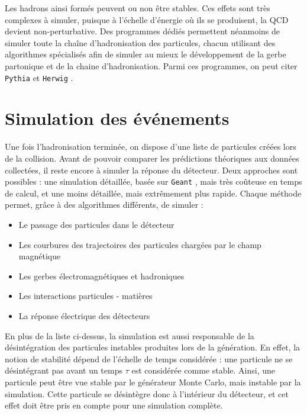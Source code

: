 Les hadrons ainsi formés peuvent ou non être stables. Ces effets sont très complexes à simuler, puisque à l'échelle d'énergie où ils se produisent, la QCD devient non-perturbative. Des programmes dédiés permettent néanmoins de simuler toute la chaîne d'hadronisation des particules, chacun utilisant des algorithmes spécialisés afin de simuler au mieux le développement de la gerbe partonique et de la chaine d'hadronisation. Parmi ces programmes, on peut citer \texttt{Pythia} \citep{pythia} et \texttt{Herwig} \citep{Corcella:2000bw}.

\section{Simulation des événements}

Une fois l'hadronisation terminée, on dispose d'une liste de particules créées lors de la collision. Avant de pouvoir comparer les prédictions théoriques aux données collectées, il reste encore à simuler la réponse du détecteur. Deux approches sont possibles : une simulation détaillée, basée sur \texttt{Geant} \citep{Agostinelli2003250}, mais très coûteuse en temps de calcul, et une moins détaillée, mais extrêmement plus rapide. Chaque méthode permet, grâce à des algorithmes différents, de simuler :
\begin{itemize}
    \item Le passage des particules dans le détecteur
    \item Les courbures des trajectoires des particules chargées par le champ magnétique
    \item Les gerbes électromagnétiques et hadroniques
    \item Les interactions particules - matières
    \item La réponse électrique des détecteurs
\end{itemize}

En plus de la liste ci-dessus, la simulation est aussi responsable de la désintégration des particules instables produites lors de la génération. En effet, la notion de stabilité dépend de l'échelle de temps considérée : une particule ne se désintégrant pas avant un temps $\tau$ est considérée comme stable. Ainsi, une particule peut être vue stable par le générateur Monte Carlo, mais instable par la simulation. Cette particule se désintègre donc à l'intérieur du détecteur, et cet effet doit être pris en compte pour une simulation complète.

\medskip

